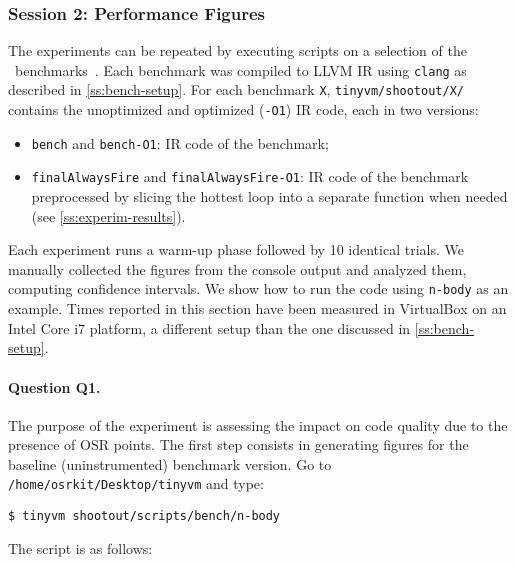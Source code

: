 
\subsubsection{Session 2: Performance Figures}

The experiments can be repeated by executing scripts on a selection of the \shootout\ benchmarks~\cite{shootout}. Each benchmark was compiled to LLVM IR using {\tt clang} as described in \mysection\ref{ss:bench-setup}. For each benchmark {\tt X}, {\tt tinyvm/shootout/X/} contains the unoptimized and optimized ({\tt -O1}) IR code, each in two versions:

\begin{itemize}[parsep=0pt]
\item {\tt bench} and {\tt bench-O1}: IR code of the benchmark;
\item {\tt finalAlwaysFire} and {\tt finalAlwaysFire-O1}: IR code of the benchmark preprocessed by slicing the hottest loop into a separate function when needed (see \ref{ss:experim-results}).
\end{itemize}

\noindent Each experiment runs a warm-up phase followed by 10 identical trials. We manually collected the figures from the console output and analyzed them, computing confidence intervals. We show how to run the code using {\tt n-body} as an example. Times reported in this section have been measured in VirtualBox on an Intel Core i7 platform, a different setup than the one discussed in \ref{ss:bench-setup}.

\paragraph{Question Q1.} The purpose of the experiment is assessing the impact on code quality due to the presence of OSR points.
The first step consists in generating figures for the baseline (uninstrumented) benchmark version. Go to {\small\tt /home/osrkit/Desktop/tinyvm} and type:
\begin{small}
\begin{verbatim}
$ tinyvm shootout/scripts/bench/n-body
\end{verbatim}
\end{small}

\noindent The script is as follows:

